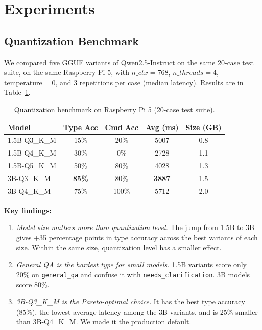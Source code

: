 \documentclass[conference]{IEEEtran}
\begin{document}
\section{Experiments}
\label{sec:experiments}

\subsection{Quantization Benchmark}

We compared five GGUF variants of Qwen2.5-Instruct on the same 20-case test suite, on the same Raspberry Pi 5, with $n\_ctx=768$, $n\_threads=4$, $\text{temperature}=0$, and 3 repetitions per case (median latency). Results are in Table~\ref{tab:quant}.

\begin{table}[h]
\centering
\caption{Quantization benchmark on Raspberry Pi 5 (20-case test suite).}
\label{tab:quant}
\renewcommand{\arraystretch}{1.15}
\begin{tabular}{lcccc}
\toprule
\textbf{Model} & \textbf{Type Acc} & \textbf{Cmd Acc} & \textbf{Avg (ms)} & \textbf{Size (GB)} \\
\midrule
1.5B-Q3\_K\_M & 15\% & 20\% & 5007 & 0.8 \\
1.5B-Q4\_K\_M & 30\% & 0\% & 2728 & 1.1 \\
1.5B-Q5\_K\_M & 50\% & 80\% & 4028 & 1.3 \\
3B-Q3\_K\_M & \textbf{85\%} & 80\% & \textbf{3887} & 1.5 \\
3B-Q4\_K\_M & 75\% & 100\% & 5712 & 2.0 \\
\bottomrule
\end{tabular}
\end{table}

\textbf{Key findings:}
\begin{enumerate}
    \item \emph{Model size matters more than quantization level.} The jump from 1.5B to 3B gives +35 percentage points in type accuracy across the best variants of each size. Within the same size, quantization level has a smaller effect.
    \item \emph{General QA is the hardest type for small models.} 1.5B variants score only 20\% on \texttt{general\_qa} and confuse it with \texttt{needs\_clarification}. 3B models score 80\%.
    \item \emph{3B-Q3\_K\_M is the Pareto-optimal choice.} It has the best type accuracy (85\%), the lowest average latency among the 3B variants, and is 25\% smaller than 3B-Q4\_K\_M. We made it the production default.
\end{enumerate}
\end{document}
